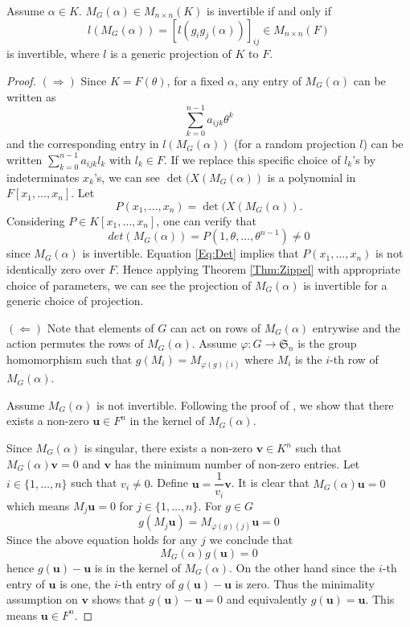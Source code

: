 \documentclass[sigconf]{acmart}
\theoremstyle{acmplain}
\begin{document}
\begin{lemma}\label{Lem:Proj}
Assume $\alpha \in K$. $M_G(\alpha) \in M_{n \times n}(K)$ 
is invertible if and only if $$l(M_G(\alpha)) =  [l(g_ig_j(\alpha))]_{ij}  \in M_{n \times n}(F)$$ is invertible,
 where $l$ is a generic projection of $K$ to $F$.
\end{lemma}

\begin{proof}
$(\Rightarrow)$ Since $K = F(\theta)$, for a fixed $\alpha$, any entry of $M_G(\alpha)$ can be written as 
\begin{equation}\label{Eq:PrimElm}
\sum_{k= 0}^{n-1} a_{ijk}\theta^k
\end{equation}
 and the corresponding entry in $l(M_G(\alpha))$ (for a random projection $l$)
 can be written $\sum_{k= 0}^{n-1} a_{ijk}l_k$ with $l_k\in F$. If we replace this specific choice of $l_k$'s by 
 indeterminates $x_k$'s, we can see $\det(X(M_G(\alpha))$ is a polynomial in $F[x_1, \ldots, x_n].$ Let 
 $$P(x_1, \ldots, x_n) = \det(X(M_G(\alpha)).$$ 
 Considering $P \in K[x_1, \ldots , x_n]$, one can verify that 
 \begin{equation}\label{Eq:Det}
 det(M_G(\alpha))= P(1, \theta, \ldots, \theta^{n-1}) \neq 0
 \end{equation}
 since $M_G(\alpha)$ is invertible. Equation \ref{Eq:Det} implies that $P(x_1, \ldots, x_n)$ is not identically zero over $F$. Hence applying Theorem \ref{Thm:Zippel} with appropriate choice of parameters, we can see 
 the projection of $M_G(\alpha)$ is invertible for a generic choice of projection. 
 
 $(\Leftarrow)$  Note that elements of $G$ can act on 
 rows of $M_G(\alpha)$ entrywise and the action permutes the rows of $M_G(\alpha)$. Assume $\varphi : G \longrightarrow \mathfrak{S}_n$ is the group homomorphism 
 such that $g(M_i) = M_{\varphi(g)(i)}$ where $M_i$ is the $i$-th row of $M_G(\alpha)$.
 
 Assume $M_G(\alpha)$ is not invertible. Following the proof of \cite[Lemma 4]{Armin}, we show that there exists a non-zero $\textbf{u} \in F^n$ in the kernel of $M_G(\alpha)$. 
 
 Since $M_G(\alpha)$ is singular, there exists a non-zero $\textbf{v} \in K^n$  such that $M_G(\alpha)\textbf{v} = 0$ and $\textbf{v}$ has the minimum number of non-zero entries. Let $i \in  \lbrace 1, \ldots , n \rbrace$ such that $v_i \neq 0$. Define $\textbf{u} = \dfrac{1}{v_i}\textbf{v}$. It is clear  that $M_G(\alpha)\textbf{u} = 0$ which means $M_j \textbf{u} = 0 $ for $j \in \lbrace 1, \ldots, n \rbrace$. For $g \in G$
 \begin{equation}
  g(M_j \textbf{u}) = M_{\varphi(g)(j)} \textbf{u}= 0
 \end{equation}
 Since the above equation holds for any $j$ we conclude that $$M_G(\alpha)g(\textbf{u})= 0$$ hence
 $g(\textbf{u})-\textbf{u}$ is in the kernel of $M_G(\alpha)$. On the other hand since the $i$-th entry 
 of $\textbf{u}$ is one, the $i$-th entry of $g(\textbf{u}) -\textbf{u}$ is zero. Thus the minimality assumption
 on $\textbf{v}$ shows that $g(\textbf{u}) -\textbf{u} = 0$ and equivalently $g(\textbf{u})=\textbf{u}$. This 
 means $\textbf{u} \in F^n$.
 

\end{proof}
\end{document}
